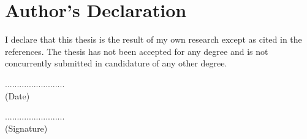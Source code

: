 \clearpage
\chapter*{Author’s Declaration}
\label{declaration}
\thispagestyle{empty}
I declare that this thesis is the result of my own research except as cited in the references. 
The thesis has not been accepted for any degree and is not concurrently submitted in candidature 
of any other degree.\\[2cm]

\begin{minipage}{0.5\textwidth}
	\begin{flushleft}
		......................... \\
		(Date) 
	\end{flushleft}
\end{minipage}
\begin{minipage}{0.5\textwidth}
	\begin{flushright}
	......................... \\
	(Signature) 
	\end{flushright}
\end{minipage}

